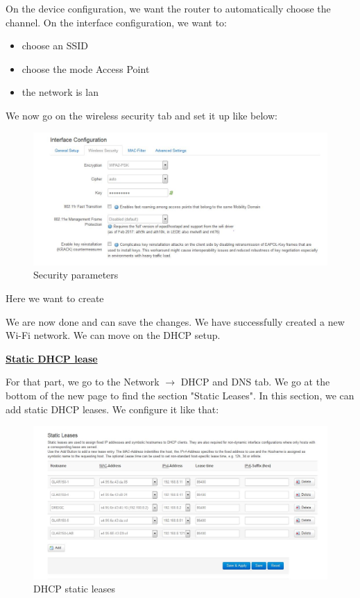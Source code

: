 On the device configuration, we want the router to automatically choose the channel.
On the interface configuration, we want to:
\begin{itemize}
	\item choose an SSID
	\item choose the mode Access Point
	\item the network is lan
\end{itemize}

We now go on the wireless security tab and set it up like below:
\begin{figure}[H]
\begin{center}
\includegraphics[width=\columnwidth]{image/wireless3.jpg}%
\caption{Security parameters}%
\label{figure:wireless3}%
\end{center}
\end{figure}
Here we want to create

We are now done and can save the changes. We have successfully created a new Wi-Fi network. We can move on the DHCP setup.

\hfill \break \underline{\large{\textbf{Static DHCP lease}}}

For that part, we go to the Network $\rightarrow$ DHCP and DNS tab. We go at the bottom of the new page to find the section "Static Leases".
In this section, we can add static DHCP leases. We configure it like that:
\begin{figure}[H]
\begin{center}
\includegraphics[width=\columnwidth]{image/DHCP1.jpg}%
\caption{DHCP static leases }%
\label{figure:DHCP1}%
\end{center}
\end{figure}


